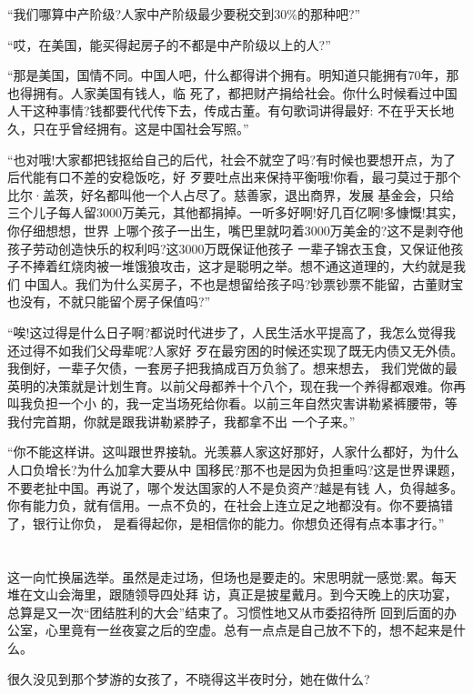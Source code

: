\documentclass[11pt,a4paper,onecolumn]{article}
\begin{document}
``我们哪算中产阶级?人家中产阶级最少要税交到30\%的那种吧?''

``哎，在美国，能买得起房子的不都是中产阶级以上的人?''

``那是美国，国情不同。中国人吧，什么都得讲个拥有。明知道只能拥有70年，那也得拥有。人家美国有钱人，临
死了，都把财产捐给社会。你什么时候看过中国人干这种事情?钱都要代代传下去，传成古董。有句歌词讲得最好:
不在乎天长地久，只在乎曾经拥有。这是中国社会写照。''

``也对哦!大家都把钱抠给自己的后代，社会不就空了吗?有时候也要想开点，为了后代能有口不差的安稳饭吃，好
歹要吐点出来保持平衡哦!你看，最刁莫过于那个比尔·盖茨，好名都叫他一个人占尽了。慈善家，退出商界，发展
基金会，只给三个儿子每人留3000万美元，其他都捐掉。一听多好啊!好几百亿啊!多慷慨!其实，你仔细想想，世界
上哪个孩子一出生，嘴巴里就叼着3000万美金的?这不是剥夺他孩子劳动创造快乐的权利吗?这3000万既保证他孩子
一辈子锦衣玉食，又保证他孩子不捧着红烧肉被一堆饿狼攻击，这才是聪明之举。想不通这道理的，大约就是我们
中国人。我们为什么买房子，不也是想留给孩子吗?钞票钞票不能留，古董财宝也没有，不就只能留个房子保值吗?''

``唉!这过得是什么日子啊?都说时代进步了，人民生活水平提高了，我怎么觉得我还过得不如我们父母辈呢?人家好
歹在最穷困的时候还实现了既无内债又无外债。我倒好，一辈子欠债，一套房子把我搞成百万负翁了。想来想去，
我们党做的最英明的决策就是计划生育。以前父母都养十个八个，现在我一个养得都艰难。你再叫我负担一个小
的，我一定当场死给你看。以前三年自然灾害讲勒紧裤腰带，等我付完首期，你就是跟我讲勒紧脖子，我都拿不出
一个子来。''

``你不能这样讲。这叫跟世界接轨。光羡慕人家这好那好，人家什么都好，为什么人口负增长?为什么加拿大要从中
国移民?那不也是因为负担重吗?这是世界课题，不要老扯中国。再说了，哪个发达国家的人不是负资产?越是有钱
人，负得越多。你有能力负，就有信用。一点不负的，在社会上连立足之地都没有。你不要搞错了，银行让你负，
是看得起你，是相信你的能力。你想负还得有点本事才行。''

\section[\thesection]{}

这一向忙换届选举。虽然是走过场，但场也是要走的。宋思明就一感觉:累。每天堆在文山会海里，跟随领导四处拜
访，真正是披星戴月。到今天晚上的庆功宴，总算是又一次``团结胜利的大会''结束了。习惯性地又从市委招待所
回到后面的办公室，心里竟有一丝夜宴之后的空虚。总有一点点是自己放不下的，想不起来是什么。

很久没见到那个梦游的女孩了，不晓得这半夜时分，她在做什么?
\end{document}
